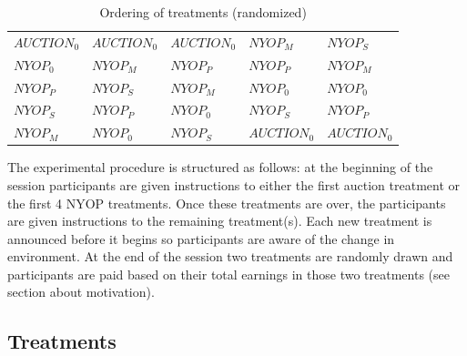 \documentclass[a4paper,12pt]{article}
\makeatletter
\newcommand\fix{%
  \let\set@color\beamerorig@set@color
  \let\reset@color\beamerorig@reset@color}
\makeatother
\begin{document}
	\begin{table}[ht]
		\caption{Ordering of treatments (randomized)}
		\begin{tabular}{l | l | l | l | l}
			$AUCTION_0$	& $AUCTION_0$ 	& $AUCTION_0$ 	& $NYOP_M$ 		& $NYOP_S$ 	\\
			$NYOP_0$ 	& $NYOP_M$		& $NYOP_P$		& $NYOP_P$		& $NYOP_M$	\\
			$NYOP_P$ 	& $NYOP_S$		& $NYOP_M$		& $NYOP_0$		& $NYOP_0$	\\
			$NYOP_S$	& $NYOP_P$		& $NYOP_0$		& $NYOP_S$		& $NYOP_P$	\\
			$NYOP_M$	& $NYOP_0$		& $NYOP_S$		& $AUCTION_0$	& $AUCTION_0$	
		\end{tabular}
		\label{tab:order}
	\end{table}
	
	The experimental procedure is structured as follows: at the beginning of the session participants are given instructions to either the first auction treatment or the first 4 NYOP treatments. Once these treatments are over, the participants are given instructions to the remaining treatment(s). Each new treatment is announced before it begins so participants are aware of the change in environment. At the end of the session two treatments are randomly drawn and participants are paid based on their total earnings in those two treatments (see section about motivation).


	\subsection{Treatments}
\end{document}
